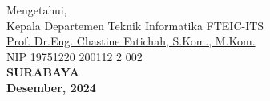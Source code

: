 \vspace{\fill}

\begin{center}
  Mengetahui,\\
  Kepala Departemen Teknik Informatika FTEIC-ITS\\
  \vspace{10ex}
  \underline{Prof. Dr.Eng. Chastine Fatichah, S.Kom., M.Kom.}\\
  NIP 19751220 200112 2 002\\
  \vspace{10ex}
  \textbf{SURABAYA} \\
  \textbf{Desember, 2024}
\end{center}
\endgroup
